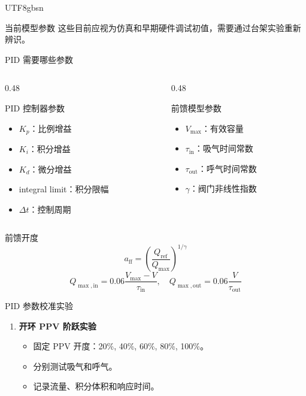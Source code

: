 \documentclass[aspectratio=169,10pt]{beamer}
\begin{document}
\begin{CJK*}{UTF8}{gbsn}
\begin{frame}{当前模型参数}
  \vspace{0.2em}
  \centering
  这些目前应视为仿真和早期硬件调试初值，需要通过台架实验重新辨识。
\end{frame}

\begin{frame}[shrink=5]{PID 需要哪些参数}
  \begin{columns}[T,onlytextwidth]
    \begin{column}{0.48\textwidth}
      \begin{block}{PID 控制器参数}
        \begin{itemize}
          \item $K_p$：比例增益
          \item $K_i$：积分增益
          \item $K_d$：微分增益
          \item integral limit：积分限幅
          \item $\Delta t$：控制周期
        \end{itemize}
      \end{block}
    \end{column}
    \begin{column}{0.48\textwidth}
      \begin{block}{前馈模型参数}
        \begin{itemize}
          \item $V_{\max}$：有效容量
          \item $\tau_{\mathrm{in}}$：吸气时间常数
          \item $\tau_{\mathrm{out}}$：呼气时间常数
          \item $\gamma$：阀门非线性指数
        \end{itemize}
      \end{block}
    \end{column}
  \end{columns}

  \vspace{0.4em}
  \begin{block}{前馈开度}
    \[
      a_{\mathrm{ff}}=
      \left(\frac{Q_{\mathrm{ref}}}{Q_{\max}}\right)^{1/\gamma}
    \]
    \[
      Q_{\max,\mathrm{in}}=0.06\frac{V_{\max}-V}{\tau_{\mathrm{in}}},
      \quad
      Q_{\max,\mathrm{out}}=0.06\frac{V}{\tau_{\mathrm{out}}}
    \]
  \end{block}
\end{frame}

\begin{frame}[shrink=5]{PID 参数校准实验}
  \begin{enumerate}
    \item \textbf{开环 PPV 阶跃实验}
      \begin{itemize}
        \item 固定 PPV 开度：20\%, 40\%, 60\%, 80\%, 100\%。
        \item 分别测试吸气和呼气。
        \item 记录流量、积分体积和响应时间。
      \end{itemize}


\end{enumerate}
\end{frame}
\end{CJK*}
\end{document}
